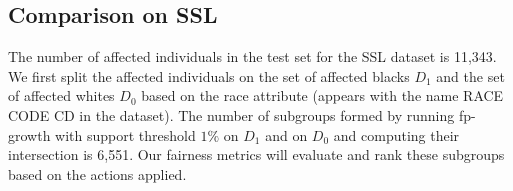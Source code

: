 \documentclass{article}
\begin{document}
\subsection{Comparison on SSL}
The number of affected individuals in the test set for the SSL dataset is 11,343. We first split the affected individuals on the set of affected blacks $D_{1}$ and the set of affected whites $D_{0}$ based on the race attribute (appears with the name RACE CODE CD in the dataset). The number of subgroups formed by running fp-growth with support threshold $1\%$ on $D_{1}$ and on $D_{0}$ and computing their intersection is 6,551.  
Our fairness metrics will evaluate and rank these subgroups based on the actions applied.





\begin{table}[ht]
\caption{Ranking Analysis in SSL}
  \label{table:analysis-SSL}
  \centering
{}
\end{table}
\end{document}
